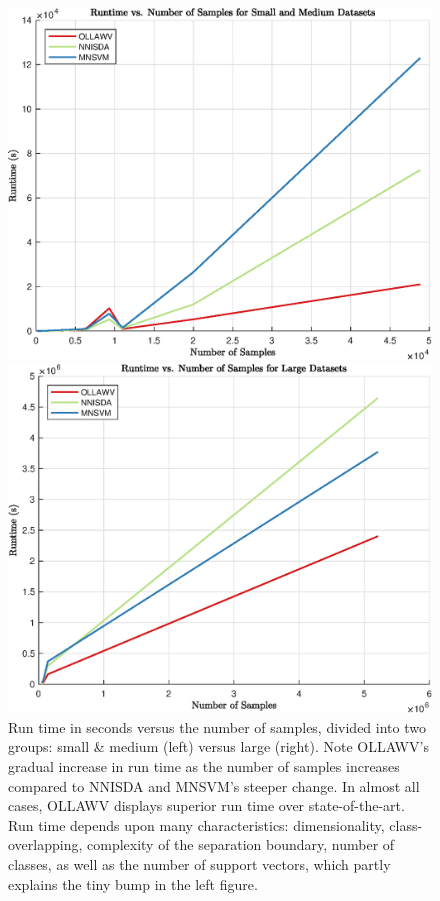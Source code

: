 \documentclass[reqno]{vcuthesis}
\numberwithin{equation}{chapter}
\begin{document}
\begin{figure}[t!]
\centering
\begin{minipage}{0.49\textwidth}
\includegraphics[width=\textwidth]{figures/CPU_vs_NumData_SM.eps}
\end{minipage}
\begin{minipage}{0.49\textwidth}
\includegraphics[width=\textwidth]{figures/CPU_vs_NumData_L.eps}
\end{minipage}
\caption{\small Run time in seconds versus the number of samples, divided into two groups: small \& medium (left) versus large (right). Note OLLAWV's gradual increase in run time as the number of samples increases compared to NNISDA and MNSVM's steeper change. In almost all cases, OLLAWV displays superior run time over state-of-the-art. Run time depends upon many characteristics: dimensionality, class-overlapping, complexity of the separation boundary, number of classes, as well as the number of support vectors, which partly explains the tiny bump in the left figure. }
\label{fig:cpuvssamples}
\end{figure}
\end{document}

